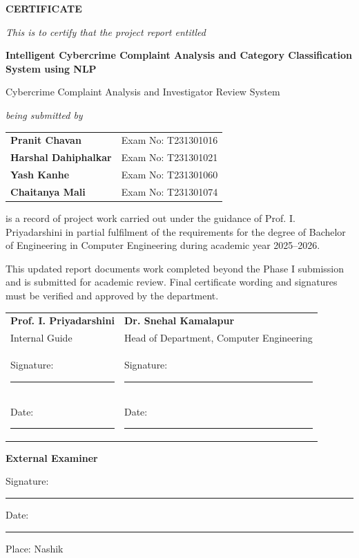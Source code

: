 \documentclass[12pt,a4paper,oneside]{report}
\begin{document}
\clearpage
\thispagestyle{empty}
\begin{center}
{\Large\bfseries CERTIFICATE\par}
\vspace{8mm}
\textit{This is to certify that the project report entitled}\par
\vspace{2mm}
{\large\bfseries Intelligent Cybercrime Complaint Analysis and Category Classification System using NLP\par}
{\normalsize Cybercrime Complaint Analysis and Investigator Review System\par}
\textit{being submitted by}\par
\vspace{3mm}
\begin{tabular}{p{}p{}}
\textbf{Pranit Chavan} & Exam No: T231301016 \\
\textbf{Harshal Dahiphalkar} & Exam No: T231301021 \\
\textbf{Yash Kanhe} & Exam No: T231301060 \\
\textbf{Chaitanya Mali} & Exam No: T231301074 \\
\end{tabular}
\end{center}

\vspace{6mm}
is a record of project work carried out under the guidance of Prof. I. Priyadarshini in partial fulfilment of the requirements for the degree of Bachelor of Engineering in Computer Engineering during academic year 2025--2026.

This updated report documents work completed beyond the Phase I submission and is submitted for academic review. Final certificate wording and signatures must be verified and approved by the department.

\vspace{16mm}
\begin{tabularx}{\textwidth}{X X}
\textbf{Prof. I. Priyadarshini} & \hfill \textbf{Dr. Snehal Kamalapur} \\
Internal Guide & \hfill Head of Department, Computer Engineering \\
Signature: \rule{45mm}{0.4pt} & \hfill Signature: \rule{45mm}{0.4pt} \\
Date: \rule{35mm}{0.4pt} & \hfill Date: \rule{35mm}{0.4pt} \\
\end{tabularx}

\vspace{13mm}
\textbf{External Examiner}\par
Signature: \rule{45mm}{0.4pt}\hspace{15mm}Date: \rule{30mm}{0.4pt}\par
Place: Nashik
\end{document}
